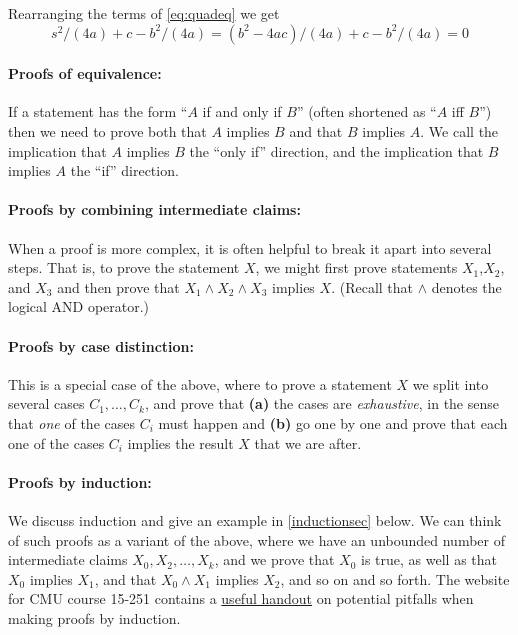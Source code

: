 Rearranging the terms of \eqref{eq:quadeq} we get \[
s^2/(4a)+c- b^2/(4a) = (b^2-4ac)/(4a) + c - b^2/(4a) = 0
\]

\paragraph{Proofs of equivalence:} If a statement has the form ``\(A\)
if and only if \(B\)'' (often shortened as ``\(A\) iff \(B\)'') then we
need to prove both that \(A\) implies \(B\) and that \(B\) implies
\(A\). We call the implication that \(A\) implies \(B\) the ``only if''
direction, and the implication that \(B\) implies \(A\) the ``if''
direction.

\paragraph{Proofs by combining intermediate claims:} When a proof is
more complex, it is often helpful to break it apart into several steps.
That is, to prove the statement \(X\), we might first prove statements
\(X_1\),\(X_2\), and \(X_3\) and then prove that
\(X_1 \wedge X_2 \wedge X_3\) implies \(X\). (Recall that \(\wedge\)
denotes the logical AND operator.)

\paragraph{Proofs by case distinction:} This is a special case of the
above, where to prove a statement \(X\) we split into several cases
\(C_1,\ldots,C_k\), and prove that \textbf{(a)} the cases are
\emph{exhaustive}, in the sense that \emph{one} of the cases \(C_i\)
must happen and \textbf{(b)} go one by one and prove that each one of
the cases \(C_i\) implies the result \(X\) that we are after.

\paragraph{Proofs by induction:} We discuss induction and give an
example in \cref{inductionsec} below. We can think of such proofs as a
variant of the above, where we have an unbounded number of intermediate
claims \(X_0,X_2,\ldots,X_k\), and we prove that \(X_0\) is true, as
well as that \(X_0\) implies \(X_1\), and that \(X_0 \wedge X_1\)
implies \(X_2\), and so on and so forth. The website for CMU course
15-251 contains a
\href{http://www.cs.cmu.edu/~./15251/notes/induction-pitfalls.pdf}{useful
handout} on potential pitfalls when making proofs by induction.

